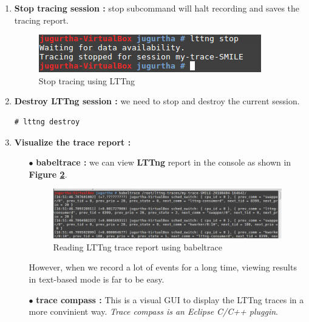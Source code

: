 \begin{enumerate}
	\item \textbf{Stop tracing session :} stop subcommand will halt recording and saves the tracing report.
		\begin{figure}[H]
			\centering
        	\includegraphics[scale=0.48]{img/solution/lttng-stop-session.png}
        	\caption{Stop tracing using LTTng}
        	\label{Stop tracing using LTTng}
    	\end{figure}
	
	\item \textbf{Destroy LTTng session :} we need to stop and destroy the current session.
			\begin{lstlisting}[style=BashInputStyle]
# lttng destroy
	\end{lstlisting}
	
		\item \textbf{Visualize the trace report : } 
		
			\begin{itemize}
				\item[$\bullet$] \textbf{babeltrace : } we can view \textbf{LTTng} report in the console as shown in \textbf{Figure \ref{Reading LTTng trace report using babeltrace}}.
		\begin{figure}[H]
			\centering
        	\includegraphics[scale=0.40]{img/solution/babel-trace.png}
        	\caption{Reading LTTng trace report using babeltrace}
        	\label{Reading LTTng trace report using babeltrace}
    	\end{figure}				
	However, when we record a lot of events for a
long time, viewing results in text-based mode is far to be easy.			
				
				\item[$\bullet$] \textbf{trace compass : } This is a visual GUI to display the LTTng traces in a more convinient way. \emph{\color{orange}Trace compass is an Eclipse C/C++ pluggin}.
			\end{itemize}
\end{enumerate}





